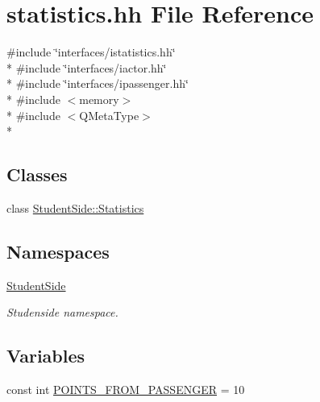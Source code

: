 \hypertarget{statistics_8hh}{\section{statistics.\-hh File Reference}
\label{statistics_8hh}
}
{\ttfamily \#include \char`\"{}interfaces/istatistics.\-hh\char`\"{}}\\*
{\ttfamily \#include \char`\"{}interfaces/iactor.\-hh\char`\"{}}\\*
{\ttfamily \#include \char`\"{}interfaces/ipassenger.\-hh\char`\"{}}\\*
{\ttfamily \#include $<$memory$>$}\\*
{\ttfamily \#include $<$Q\-Meta\-Type$>$}\\*
\subsection*{Classes}
\begin{DoxyCompactItemize}
\item 
class \hyperlink{class_student_side_1_1_statistics}{Student\-Side\-::\-Statistics}
\end{DoxyCompactItemize}
\subsection*{Namespaces}
\begin{DoxyCompactItemize}
\item 
\hyperlink{namespace_student_side}{Student\-Side}
\begin{DoxyCompactList}\small\item\em Studenside namespace. \end{DoxyCompactList}\end{DoxyCompactItemize}
\subsection*{Variables}
\begin{DoxyCompactItemize}
\item 
const int \hyperlink{statistics_8hh_ac9a5f98765234c28f52a4da93922c103}{P\-O\-I\-N\-T\-S\-\_\-\-F\-R\-O\-M\-\_\-\-P\-A\-S\-S\-E\-N\-G\-E\-R} = 10
\end{DoxyCompactItemize}



